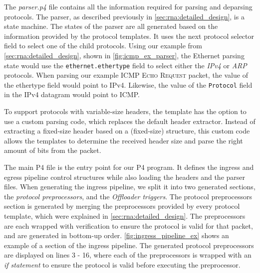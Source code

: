 The \textit{parser.p4} file contains all the information required for parsing and deparsing protocols. The parser, as described previously in \autoref{sec:rna:detailed_design}, is a state machine. The states of the parser are all generated based on the information provided by the protocol templates. It uses the next protocol selector field to select one of the child protocols. Using our example from \autoref{sec:rna:detailed_design}, shown in \autoref{fig:icmp_ex_parser}, the Ethernet parsing state would use the \texttt{ethernet.ethertype} field to select either the \textit{IPv4} or \textit{ARP} protocols. When parsing our example \textsc{ICMP Echo Request} packet, the value of the ethertype field would point to IPv4. Likewise, the value of the \texttt{Protocol} field in the IPv4 datagram would point to ICMP.

To support protocols with variable-size headers, the template has the option to use a custom parsing code, which replaces the default header extractor. Instead of extracting a fixed-size header based on a (fixed-size) structure, this custom code allows the templates to determine the received header size and parse the right amount of bits from the packet.


The main P4 file is the entry point for our P4 program. It defines the ingress and egress pipeline control structures while also loading the headers and the parser files. When generating the ingress pipeline, we split it into two generated sections, the \textit{protocol preprocessors}, and the \textit{Offloader triggers}. The protocol preprocessors section is generated by merging the preprocessors provided by every protocol template, which were explained in \autoref{sec:rna:detailed_design}. The preprocessors are each wrapped with verification to ensure the protocol is valid for that packet, and are generated in bottom-up order. \autoref{fig:ingress_pipeline_ex} shows an example of a section of the ingress pipeline. The generated protocol preprocessors are displayed on lines 3 - 16, where each of the preprocessors is wrapped with an \textit{if statement} to ensure the protocol is valid before executing the preprocessor.

